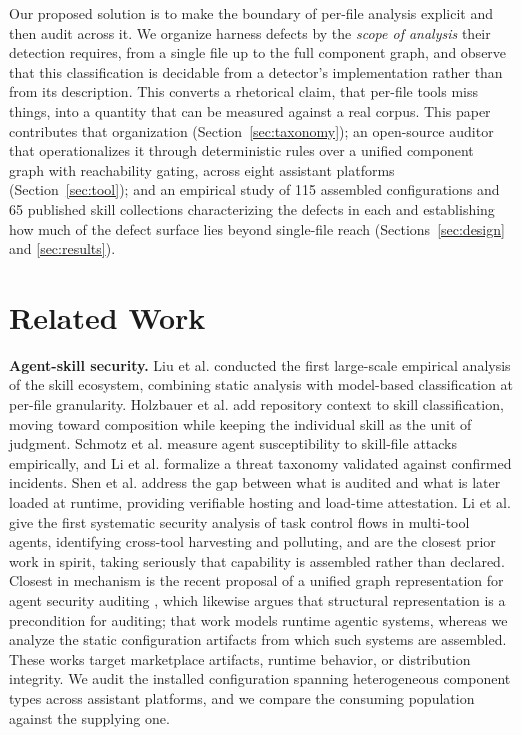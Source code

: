 \documentclass[conference]{IEEEtran}
\begin{document}
Our proposed solution is to make the boundary of per-file analysis explicit and
then audit across it. We organize harness defects by the \emph{scope of
analysis} their detection requires, from a single file up to the full component
graph, and observe that this classification is decidable from a detector's
implementation rather than from its description. This converts a rhetorical
claim, that per-file tools miss things, into a quantity that can be measured
against a real corpus. This paper contributes that organization
(Section~\ref{sec:taxonomy}); an open-source auditor that operationalizes it
through deterministic rules over a unified component graph with reachability
gating, across eight assistant platforms (Section~\ref{sec:tool}); and an
empirical study of 115 assembled configurations and 65 published skill
collections characterizing the defects in each and establishing how much of the
defect surface lies beyond single-file reach (Sections~\ref{sec:design} and
\ref{sec:results}).

\section{Related Work}

\textbf{Agent-skill security.} Liu et al. \cite{liu2026wild} conducted the first
large-scale empirical analysis of the skill ecosystem, combining static analysis
with model-based classification at per-file granularity. Holzbauer et al.
\cite{holzbauer2026context} add repository context to skill classification,
moving toward composition while keeping the individual skill as the unit of
judgment. Schmotz et al. \cite{schmotz2026skillinject} measure agent
susceptibility to skill-file attacks empirically, and Li et al.
\cite{li2026securing} formalize a threat taxonomy validated against confirmed
incidents. Shen et al. \cite{sigil2026} address the gap between what is audited
and what is later loaded at runtime, providing verifiable hosting and load-time
attestation. Li et al. \cite{lesdissonances2025} give the first systematic
security analysis of task control flows in multi-tool agents, identifying
cross-tool harvesting and polluting, and are the closest prior work in spirit,
taking seriously that capability is assembled rather than declared. Closest in
mechanism is the recent proposal of a unified graph representation for agent
security auditing \cite{agentbom2026}, which likewise argues that structural
representation is a precondition for auditing; that work models runtime agentic
systems, whereas we analyze the static configuration artifacts from which such
systems are assembled. These works target marketplace artifacts, runtime
behavior, or distribution integrity. We audit the installed configuration
spanning heterogeneous component types across assistant platforms, and we
compare the consuming population against the supplying one.
\end{document}
